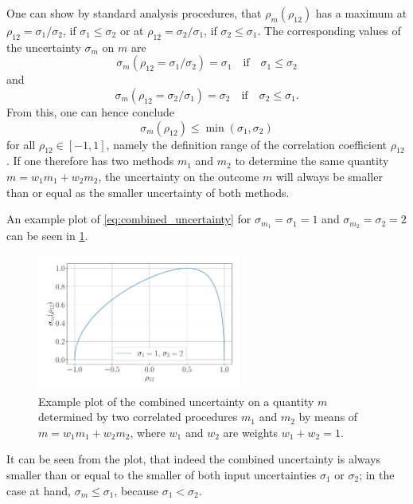 \documentclass{report}
\numberwithin{tm}{section}
\begin{document}
\begin{equation}
\end{equation} One can show by standard analysis procedures, that $\rho_m(\rho_{12})$ has a maximum at $\rho_{12} = \sigma_1/\sigma_2$, if $\sigma_1 \leq \sigma_2$ or at $\rho_{12}= \sigma_2/\sigma_1$, if $\sigma_2 \leq \sigma_1$. The corresponding values of the uncertainty $\sigma_m$ on $m$ are \begin{equation}
\sigma_m(\rho_{12}=\sigma_1/\sigma_2) = \sigma_1 \quad \text{if} \quad \sigma_1 \leq \sigma_2
\end{equation} and \begin{equation} \sigma_m(\rho_{12}=\sigma_2/\sigma_1) = \sigma_2 \quad \text{if} \quad \sigma_2  \leq \sigma_1.
\end{equation} From this, one can hence conclude \begin{equation}
\sigma_m(\rho_{12}) \leq \min(\sigma_1,\sigma_2)
\end{equation} for all $\rho_{12} \in [-1,1]$, namely the definition range of the correlation coefficient $\rho_{12}$. If one therefore has two methods $m_1$ and $m_2$ to determine the same quantity $m = w_1m_1 + w_2m_2$, the uncertainty on the outcome $m$ will always be smaller than or equal as the smaller uncertainty of both methods.

An example plot of \cref{eq:combined_uncertainty} for $\sigma_{m_1} = \sigma_1 = 1$ and $\sigma_{m_2} = \sigma_2 = 2$ can be seen in \cref{fig:correlated_procedures}.
\begin{figure}[h]
	\centering
	\includegraphics[width=0.6\textwidth]{figures/correlated_procedures.pdf}
	\caption{Example plot of the combined uncertainty on a quantity $m$ determined by two correlated procedures $m_1$ and $m_2$ by means of $m = w_1m_1 + w_2m_2$, where $w_1$ and $w_2$ are weights $w_1 + w_2 = 1$.}
	\label{fig:correlated_procedures}
\end{figure}
It can be seen from the plot, that indeed the combined uncertainty is always smaller than or equal to the smaller of both input uncertainties $\sigma_1$ or $\sigma_2$; in the case at hand, $\sigma_m \leq \sigma_1$, because $\sigma_1 < \sigma_2$.
	


	
\end{document}
